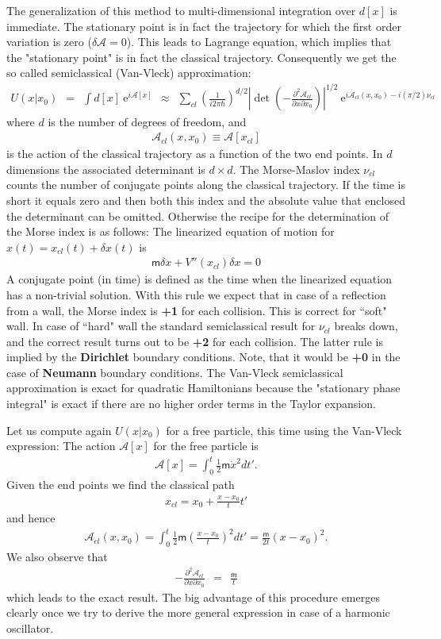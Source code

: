 \documentclass[onecolumn,fleqn, 11pt]{revtex4}
\newcommand{\eexp}{\mathrm{e}^}
\newcommand{\mass}{\mathsf{m}}
\newcommand{\beq}{\begin{eqnarray}}
\newcommand{\eeq}{\end{eqnarray}}
\begin{document}
The generalization of this method to multi-dimensional integration 
over $d[x]$ is immediate. The stationary point is in fact the trajectory 
for which the first order variation is zero ($\delta \mathcal{A} = 0$). 
This leads to Lagrange equation, which implies that the 
"stationary point" is in fact the classical trajectory.
Consequently we get the so called semiclassical (Van-Vleck) approximation:     
\beq
U(x|x_0) \ \ = \ \ 
\int d[x] \ \eexp{i\mathcal{A}[x]}
\ \ \approx  \ \ 
\sum_{cl}\left(\frac{1}{i 2\pi\hbar }\right)^{{d}/{2}}
\left|\det\left( -\frac {\partial^{2}\mathcal{A}_{cl}} {\partial x\partial x_0} \right)\right|^{1/2} 
\ \eexp{i \mathcal{A}_{cl}(x,x_0) - i(\pi/2)\nu_{cl}}
\eeq
where $d$ is the number of degrees of freedom, and 
\beq
\mathcal{A}_{cl}(x,x_{0})\equiv \mathcal{A}[x_{cl}] 
\eeq
is the action of the classical trajectory as a function 
of the two end points. In $d$ dimensions the associated 
determinant is $d \times d$. 
The Morse-Maslov index $\nu_{cl}$ counts the number of 
conjugate points along the classical trajectory.
If the time is short it equals zero and then both this 
index and the absolute value that enclosed the determinant
can be omitted. Otherwise the recipe for the determination 
of the Morse index is as follows:
The linearized equation of motion 
for $x(t) = x_{cl}(t) + \delta x(t)$ is
\beq
\mass \delta \ddot{x} + V''(x_{cl}) \delta x = 0
\eeq
A conjugate point (in time) is defined as the time when the 
linearized equation has a non-trivial solution.
With this rule we expect that in case of a reflection from 
a wall, the Morse index is {\bf +1} for each collision. 
This is correct for ``soft" wall. In case of ``hard" wall 
the standard semiclassical result for $\nu_{cl}$ breaks down, 
and the correct result turns out to be {\bf +2} for each collision. 
The latter rule is implied by the {\bf Dirichlet} boundary conditions. 
Note, that it would be {\bf +0} in the case of {\bf Neumann} boundary conditions.
The Van-Vleck semiclassical approximation is exact for 
quadratic Hamiltonians because the "stationary phase integral" is exact 
if there are no higher order terms in the Taylor expansion.  


Let us compute again $U(x|x_0)$ for a free particle, 
this time using the Van-Vleck expression: 
The action $\mathcal{A}[x]$ for the free particle is  
\beq
\mathcal{A}[x]=\int_{0}^{t}\frac{1}{2}\mass \dot{x}^{2}dt'.
\eeq
Given the end points we find the classical path  
\beq
x_{cl}=x_{0}+\frac{x-x_{0}}{t}t'
\eeq
and hence 
\beq
\mathcal{A}_{cl}(x,x_0)=\int_{0}^{t}\frac{1}{2}
\mass(\frac{x-x_{0}}{t})^{2}dt' =
\frac{\mass}{2t}(x-x_0)^2.
\eeq
We also observe that 
\beq
-\frac{\partial^{2}\mathcal{A}_{cl}}{\partial x\partial x_0} 
\ \ = \ \ \frac{\mass}{t}
\eeq
which leads to the exact result.
The big advantage of this procedure 
emerges clearly once we try to 
derive the more general expression 
in case of a harmonic oscillator. 
\end{document}
